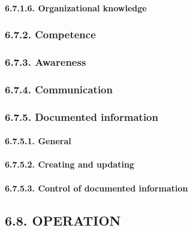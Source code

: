 \documentclass[
]{article}
\begin{document}
\hypertarget{organizational-knowledge-1}{%
\paragraph{6.7.1.6. Organizational
knowledge}\label{organizational-knowledge-1}}

\hypertarget{competence-1}{%
\subsubsection{6.7.2. Competence}\label{competence-1}}

\hypertarget{awareness-1}{%
\subsubsection{6.7.3. Awareness}\label{awareness-1}}

\hypertarget{communication-1}{%
\subsubsection{6.7.4. Communication}\label{communication-1}}

\hypertarget{documented-information-1}{%
\subsubsection{6.7.5. Documented
information}\label{documented-information-1}}

\hypertarget{general-12}{%
\paragraph{6.7.5.1. General}\label{general-12}}

\hypertarget{creating-and-updating-1}{%
\paragraph{6.7.5.2. Creating and
updating}\label{creating-and-updating-1}}

\hypertarget{control-of-documented-information-1}{%
\paragraph{6.7.5.3. Control of documented
information}\label{control-of-documented-information-1}}

\hypertarget{operation-1}{%
\subsection{6.8. OPERATION}\label{operation-1}}
\end{document}
